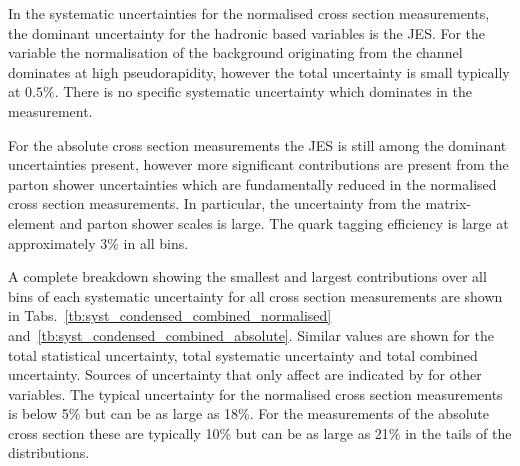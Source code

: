 In the systematic uncertainties for the normalised cross section measurements, the dominant uncertainty for the hadronic based variables is the JES.
For the \LETA{} variable the normalisation of the background \QCD{} originating from the \eJets{} channel dominates at high pseudorapidity, however the total uncertainty is small typically at $0.5\%$.
There is no specific systematic uncertainty which dominates in the \LPT{} measurement.

For the absolute cross section measurements the JES is still among the dominant uncertainties present, however more significant contributions are present from the parton shower uncertainties which are fundamentally reduced in the normalised cross section measurements.
In particular, the uncertainty from the matrix-element and parton shower scales is large.
The \bquark{} quark tagging efficiency is large at approximately 3\% in all bins.

A complete breakdown showing the smallest and largest contributions over all bins of each systematic uncertainty for all cross section measurements are shown in Tabs.~\ref{tb:syst_condensed_combined_normalised} and~\ref{tb:syst_condensed_combined_absolute}.
Similar values are shown for the total statistical uncertainty, total systematic uncertainty and total combined uncertainty.
Sources of uncertainty that only affect \ptmiss{} are indicated by \NA{} for other variables.
The typical uncertainty for the normalised cross section measurements is below 5\% but can be as large as 18\%.
For the measurements of the absolute cross section these are typically 10\% but can be as large as 21\% in the tails of the distributions.

 

